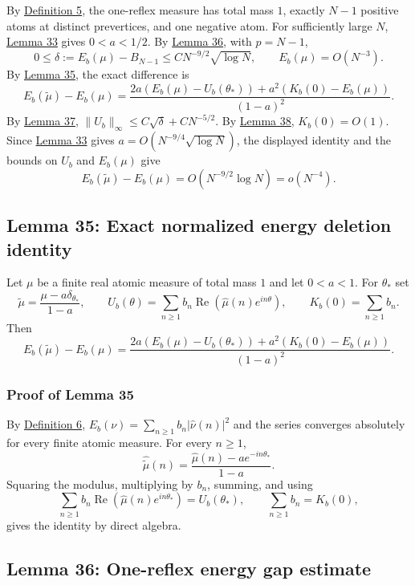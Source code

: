 \documentclass[11pt]{article}
\begin{document}
By \hyperref[def-turn-measure]{Definition 5}, the one-reflex measure has
total mass \(1\), exactly \(N-1\) positive atoms at distinct
prevertices, and one negative atom. For sufficiently large \(N\),
\hyperref[lem-single-reflex-small-atom]{Lemma 33} gives \(0<a<1/2\). By
\hyperref[lem-one-reflex-energy-gap]{Lemma 36}, with \(p=N-1\), \[
0\le\delta:=E_b(\mu)-B_{N-1}\le CN^{-9/2}\sqrt{\log N},
\qquad E_b(\mu)=O(N^{-3}).
\] By \hyperref[lem-energy-deletion-identity]{Lemma 35}, the exact
difference is \[
E_b(\widetilde\mu)-E_b(\mu)=
\frac{2a(E_b(\mu)-U_b(\theta_*))+a^2(K_b(0)-E_b(\mu))}{(1-a)^2}.
\] By \hyperref[lem-kernel-potential-bound]{Lemma 37},
\(\|U_b\|_\infty\le C\sqrt\delta+CN^{-5/2}\). By
\hyperref[lem-kernel-diagonal-bound]{Lemma 38}, \(K_b(0)=O(1)\). Since
\hyperref[lem-single-reflex-small-atom]{Lemma 33} gives
\(a=O(N^{-9/4}\sqrt{\log N})\), the displayed identity and the bounds on
\(U_b\) and \(E_b(\mu)\) give \[
E_b(\widetilde\mu)-E_b(\mu)=O(N^{-9/2}\log N)=o(N^{-4}).
\]

\subsection{Lemma 35: Exact normalized energy deletion
identity}\label{lem-energy-deletion-identity}

Let \(\mu\) be a finite real atomic measure of total mass \(1\) and let
\(0<a<1\). For \(\theta_*\) set \[
\widetilde\mu=\frac{\mu-a\delta_{\theta_*}}{1-a},
\qquad
U_b(\theta)=\sum_{n\ge1}b_n\operatorname{Re}(\widehat\mu(n)e^{in\theta}),
\qquad K_b(0)=\sum_{n\ge1}b_n.
\] Then \[
E_b(\widetilde\mu)-E_b(\mu)=
\frac{2a(E_b(\mu)-U_b(\theta_*))+a^2(K_b(0)-E_b(\mu))}{(1-a)^2}.
\]

\subsubsection{Proof of Lemma
35}\label{proof-lem-energy-deletion-identity}

By \hyperref[def-positive-kernel]{Definition 6},
\(E_b(\nu)=\sum_{n\ge1}b_n|\widehat\nu(n)|^2\) and the series converges
absolutely for every finite atomic measure. For every \(n\ge1\), \[
\widehat{\widetilde\mu}(n)=\frac{\widehat\mu(n)-a e^{-in\theta_*}}{1-a}.
\] Squaring the modulus, multiplying by \(b_n\), summing, and using \[
\sum_{n\ge1}b_n\operatorname{Re}(\widehat\mu(n)e^{in\theta_*})=U_b(\theta_*),
\qquad
\sum_{n\ge1}b_n=K_b(0),
\] gives the identity by direct algebra.

\subsection{Lemma 36: One-reflex energy gap
estimate}\label{lem-one-reflex-energy-gap}
\end{document}

